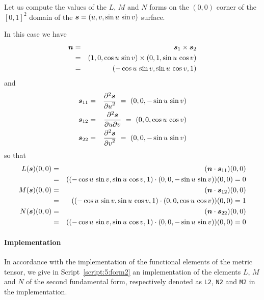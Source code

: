 \documentclass{31x47jw}
\begin{document}
\begin{example}
Let us compute the values of
the $L$, $M$ and $N$ forms on the $(0,0)$ corner of the $[0,1]^{2}$
domain of the ${\mbox{\boldmath $s$}}=(u,v,\sin u\,\sin v)$ surface.  

In this case we have
\begin{eqnarray*}
{\mbox{\boldmath $n$}} &=& {\mbox{\boldmath $s$}}_{1}\times{\mbox{\boldmath $s$}}_{2} \\
 &=& (1,0,\cos u\,\sin v) \times (0,1,\sin u\,\cos v) \\
 &=& (- \cos u\,\sin v, \sin u\,\cos v, 1)
\end{eqnarray*}
and
\begin{eqnarray*}
{\mbox{\boldmath $s$}}_{11} &=& {\partial^{2} {\mbox{\boldmath $s$}} \over{ \partial u}^{2}} 
\ =\ (0,0,-\sin u\,\sin v)\\
{\mbox{\boldmath $s$}}_{12} &=& {\partial^{2} {\mbox{\boldmath $s$}} \over{ \partial u}{ \partial v}} 
\ =\ (0,0,\cos u\,\cos v)\\
{\mbox{\boldmath $s$}}_{22} &=& {\partial^{2} {\mbox{\boldmath $s$}} \over{ \partial v}^{2}} 
\ =\ (0,0,-\sin u\,\sin v)
\end{eqnarray*}
so that
\begin{eqnarray*}
L({\mbox{\boldmath $s$}}) (0,0) &=& ({\mbox{\boldmath $n$}}\cdot{\mbox{\boldmath $s$}}_{11})(0,0) \\
&=& ((- \cos u\,\sin v, \sin u\,\cos v, 1)\cdot(0,0,-\sin u\,\sin v))(0,0) = 0\\
M({\mbox{\boldmath $s$}}) (0,0) &=& ({\mbox{\boldmath $n$}}\cdot{\mbox{\boldmath $s$}}_{12})(0,0)\\
&=& ((- \cos u\,\sin v,
\sin u\,\cos v, 1) \cdot (0,0,\cos u\,\cos v))(0,0) = 1\\
N({\mbox{\boldmath $s$}}) (0,0) &=& ({\mbox{\boldmath $n$}}\cdot{\mbox{\boldmath $s$}}_{22})(0,0) \\
&=& ((- \cos u\,\sin v, \sin u\,\cos v, 1)\cdot(0,0,-\sin u\,\sin v))(0,0) = 0
\end{eqnarray*}

\end{example}

\paragraph{Implementation}

In accordance with the implementation of the functional elements of
the metric tensor, we give in Script~\ref{script:5:form2} an
implementation of the elements $L$, $M$ and $N$ of the second
fundamental form, respectively denoted as \texttt{L2}, \texttt{N2} and
\texttt{M2} in the implementation.
\end{document}
